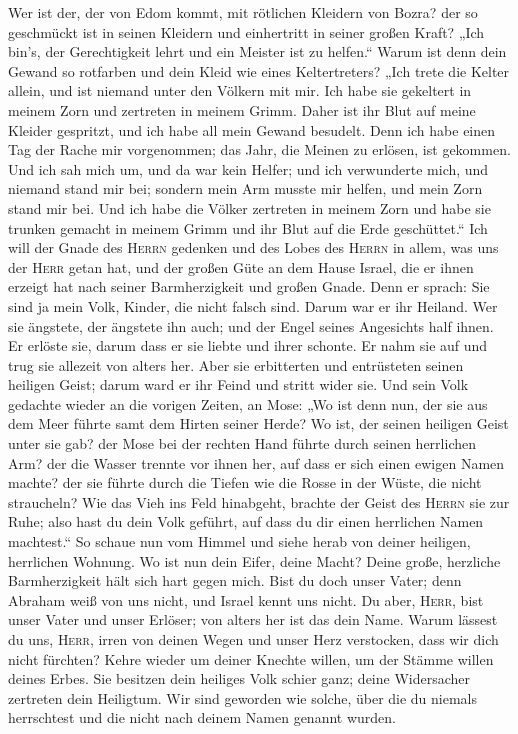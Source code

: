  Wer ist der, der von Edom kommt, mit rötlichen Kleidern
von Bozra? der so geschmückt ist in seinen Kleidern und einhertritt in
seiner großen Kraft? „Ich bin's, der Gerechtigkeit lehrt und ein Meister
ist zu helfen.``  Warum ist denn dein Gewand so rotfarben
und dein Kleid wie eines Keltertreters?  „Ich trete die
Kelter allein, und ist niemand unter den Völkern mit mir. Ich habe sie
gekeltert in meinem Zorn und zertreten in meinem Grimm. Daher ist ihr
Blut auf meine Kleider gespritzt, und ich habe all mein Gewand besudelt.
 Denn ich habe einen Tag der Rache mir vorgenommen; das
Jahr, die Meinen zu erlösen, ist gekommen.  Und ich sah
mich um, und da war kein Helfer; und ich verwunderte mich, und niemand
stand mir bei; sondern mein Arm musste mir helfen, und mein Zorn stand
mir bei.  Und ich habe die Völker zertreten in meinem Zorn
und habe sie trunken gemacht in meinem Grimm und ihr Blut auf die Erde
geschüttet.``  Ich will der Gnade des \textsc{Herrn}
gedenken und des Lobes des \textsc{Herrn} in allem, was uns der
\textsc{Herr} getan hat, und der großen Güte an dem Hause Israel, die er
ihnen erzeigt hat nach seiner Barmherzigkeit und großen Gnade.
 Denn er sprach: Sie sind ja mein Volk, Kinder, die nicht
falsch sind. Darum war er ihr Heiland.  Wer sie ängstete,
der ängstete ihn auch; und der Engel seines Angesichts half ihnen. Er
erlöste sie, darum dass er sie liebte und ihrer schonte. Er nahm sie auf
und trug sie allezeit von alters her.  Aber sie
erbitterten und entrüsteten seinen heiligen Geist; darum ward er ihr
Feind und stritt wider sie.  Und sein Volk gedachte
wieder an die vorigen Zeiten, an Mose: „Wo ist denn nun, der sie aus dem
Meer führte samt dem Hirten seiner Herde? Wo ist, der seinen heiligen
Geist unter sie gab?  der Mose bei der rechten Hand
führte durch seinen herrlichen Arm? der die Wasser trennte vor ihnen
her, auf dass er sich einen ewigen Namen machte?  der sie
führte durch die Tiefen wie die Rosse in der Wüste, die nicht
straucheln?  Wie das Vieh ins Feld hinabgeht, brachte der
Geist des \textsc{Herrn} sie zur Ruhe; also hast du dein Volk geführt,
auf dass du dir einen herrlichen Namen machtest.``  So
schaue nun vom Himmel und siehe herab von deiner heiligen, herrlichen
Wohnung. Wo ist nun dein Eifer, deine Macht? Deine große, herzliche
Barmherzigkeit hält sich hart gegen mich.  Bist du doch
unser Vater; denn Abraham weiß von uns nicht, und Israel kennt uns
nicht. Du aber, \textsc{Herr}, bist unser Vater und unser Erlöser; von
alters her ist das dein Name.  Warum lässest du uns,
\textsc{Herr}, irren von deinen Wegen und unser Herz verstocken, dass
wir dich nicht fürchten? Kehre wieder um deiner Knechte willen, um der
Stämme willen deines Erbes.  Sie besitzen dein heiliges
Volk schier ganz; deine Widersacher zertreten dein Heiligtum.
 Wir sind geworden wie solche, über die du niemals
herrschtest und die nicht nach deinem Namen genannt wurden.

